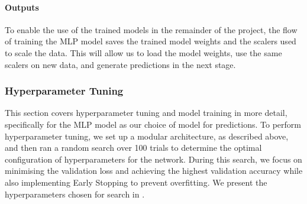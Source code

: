 \paragraph{Outputs}
To enable the use of the trained models in the remainder of the project, the flow of training the MLP model saves the trained model weights and the scalers used to scale the data. This will allow us to load the model weights, use the same scalers on new data, and generate predictions in the next stage.

\subsubsection{Hyperparameter Tuning}
\label{link:hyperparam-tuning}
This section covers hyperparameter tuning and model training in more detail, specifically for the MLP model as our choice of model for predictions. To perform hyperparameter tuning, we set up a modular architecture, as described above, and then ran a random search over 100 trials to determine the optimal configuration of hyperparameters for the network. During this search, we focus on minimising the validation loss and achieving the highest validation accuracy while also implementing Early Stopping to prevent overfitting. We present the hyperparameters chosen for search in .

\begin{table}[!ht]
    \centering
    \caption{Hyperparameter grid for search on MLP architecture}
    \label{table:hyperparameters-mlp}
\end{table}

